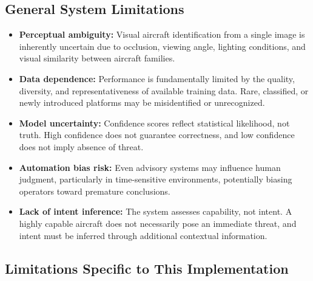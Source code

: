 \documentclass[11pt]{article}
\begin{document}
\subsection*{General System Limitations}

\begin{itemize}
    \item \textbf{Perceptual ambiguity:} Visual aircraft identification from a single image is inherently uncertain due to occlusion, viewing angle, lighting conditions, and visual similarity between aircraft families.
    
    \item \textbf{Data dependence:} Performance is fundamentally limited by the quality, diversity, and representativeness of available training data. Rare, classified, or newly introduced platforms may be misidentified or unrecognized.
    
    \item \textbf{Model uncertainty:} Confidence scores reflect statistical likelihood, not truth. High confidence does not guarantee correctness, and low confidence does not imply absence of threat.
    
    \item \textbf{Automation bias risk:} Even advisory systems may influence human judgment, particularly in time-sensitive environments, potentially biasing operators toward premature conclusions.
    
    \item \textbf{Lack of intent inference:} The system assesses capability, not intent. A highly capable aircraft does not necessarily pose an immediate threat, and intent must be inferred through additional contextual information.
\end{itemize}

\subsection*{Limitations Specific to This Implementation}
\end{document}
